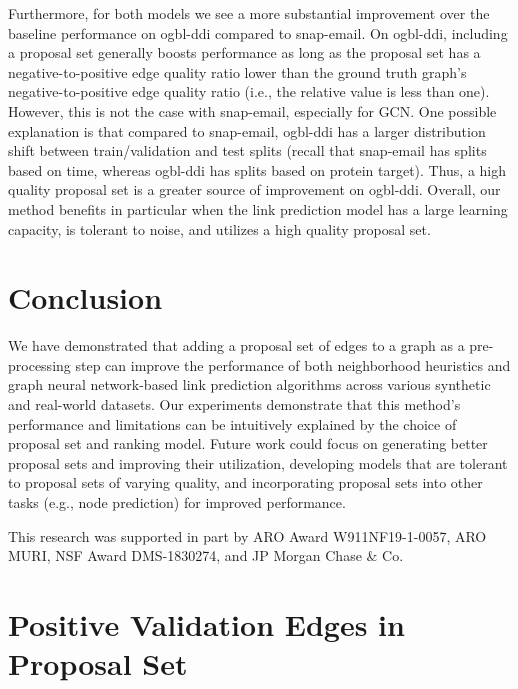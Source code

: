 \documentclass{article}
\newcommand{\xhdr}[1]{\vspace{1.0mm}\noindent{\textbf{#1.}}\hspace{1mm}}
\begin{document}
Furthermore, for both models we see a more substantial improvement over the baseline performance on ogbl-ddi compared to snap-email. 
On ogbl-ddi, including a proposal set generally boosts performance as long as the proposal set has a negative-to-positive edge quality ratio lower than the ground truth graph's negative-to-positive edge quality ratio (i.e., the relative value is less than one). However, this is not the case with snap-email, especially for GCN. 
One possible explanation is that compared to snap-email, ogbl-ddi has a larger distribution shift between train/validation and test splits (recall that snap-email has splits based on time, whereas ogbl-ddi has splits based on protein target). Thus, a high quality proposal set is a greater source of improvement on ogbl-ddi. Overall, our method benefits in particular when the link prediction model has a large learning capacity, is tolerant to noise, and utilizes a high quality proposal set.

\section{Conclusion}\label{conclusion}
We have demonstrated that adding a proposal set of edges to a graph as a pre-processing step can improve the performance of both neighborhood heuristics and graph neural network-based link prediction algorithms across various synthetic and real-world datasets. Our experiments demonstrate that this method's performance and limitations can be intuitively explained by the choice of proposal set and ranking model. Future work could focus on generating better proposal sets and improving their utilization, developing models that are tolerant to proposal sets of varying quality, and incorporating proposal sets into other tasks (e.g., node prediction) for improved performance. 



\bigskip

\xhdr{Acknowledgements}
This research was supported in part by ARO Award W911NF19-1-0057, ARO MURI, NSF Award DMS-1830274,
and JP Morgan Chase \& Co.




\clearpage

\appendix
\section{Positive Validation Edges in Proposal Set}\label{sec:validationedge}
\end{document}
